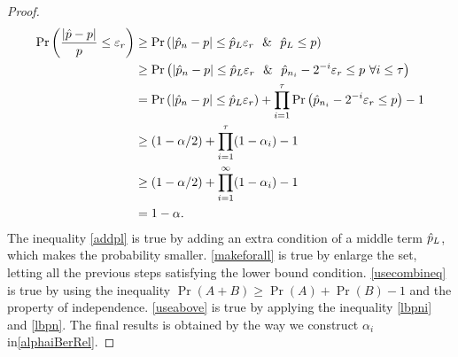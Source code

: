 \documentclass{iitthesis}
\theoremstyle{definition}
\begin{document}
\begin{proof}
\begin{align}
 \Pr \left ( \frac{\abs{\hp - p}}{p} \leq \varepsilon_r\right ) & \geq \Pr \left ( \abs{\hp_n - p} \leq \hp_L\varepsilon_r \ \ \& \ \   \hp_L \leq p \right ) \label{addpl}\\&
 \geq \Pr \left( \abs{\hp_n - p} \leq \hp_L \varepsilon_r \ \  \& \ \  \hp_{n_i} - 2^{-i}\varepsilon_r \leq p\  \forall i  \leq \tau \right) \label{makeforall}\\&
  = \Pr\left ( \abs{\hp_n - p} \leq \hp_L \varepsilon_r \right)+ \prod_{i = 1}^\tau \Pr \left(\hp_{n_i} - 2^{-i}\varepsilon_r  \leq p \right)-1\label{usecombineq} \\&
\geq (1-\alpha/2)+\prod_{i=1}^\tau(1-\alpha_i)-1 \label{useabove} \\&
\geq (1-\alpha/2)+\prod_{i=1}^\infty (1-\alpha_i)-1  \\&
 = 1-\alpha \label{constructalphai}.
\end{align}
The inequality \eqref{addpl} is true by adding an extra condition of a middle term  $\hat{p}_L$, which makes the probability smaller. \eqref{makeforall} is true by enlarge the set, letting all the previous steps satisfying the lower bound condition. \eqref{usecombineq} is true by using the inequality $\Pr(A+B)\geq\Pr(A)+\Pr(B)-1$ and the property of independence. \eqref{useabove} is true by applying the inequality \eqref{lbpni} and \eqref{lbpn}. The final results is obtained by the way we construct $\alpha_i$ in\eqref{alphaiBerRel}.
\end{proof}
\end{document}
